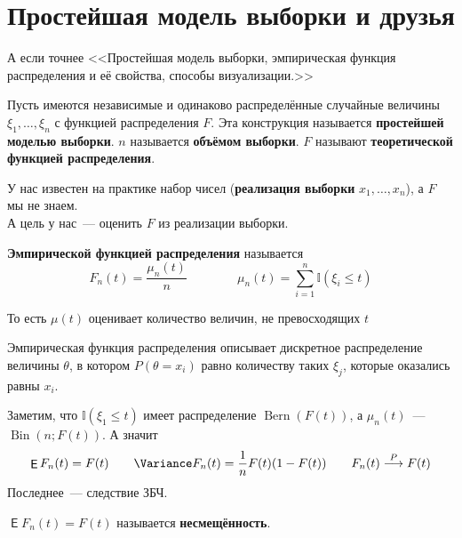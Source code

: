 \documentclass{article}
\DeclareMathOperator{\Expected}{\mathsf{E}}
\begin{document}
    \section{Простейшая модель выборки и друзья}
    \begin{remark}
        А если точнее <<Простейшая модель выборки, эмпирическая функция распределения и её свойства, способы визуализации.>>
    \end{remark}
    \begin{definition}
        Пусть имеются независимые и одинаково распределённые случайные величины $\xi_1,\ldots,\xi_n$ с функцией распределения $F$. Эта конструкция называется \textbf{простейшей моделью выборки}. $n$ называется \textbf{объёмом выборки}. $F$ называют \textbf{теоретической функцией распределения}.
    \end{definition}
    \begin{remark}
        У нас известен на практике набор чисел (\textbf{реализация выборки} $x_1,\ldots,x_n$), а $F$ мы не знаем.\\
        А цель у нас~--- оценить $F$ из реализации выборки.
    \end{remark}
    \begin{definition}
        \textbf{Эмпирической функцией распределения} называется
        \[
        F_n(t)=\frac{\mu_n(t)}n\qquad\qquad \mu_n(t)=\sum\limits_{i=1}^n\mathbb I(\xi_i\leqslant t)
        \]
    \end{definition}
    \begin{remark}
        То есть $\mu(t)$ оценивает количество величин, не превосходящих $t$
    \end{remark}
    \begin{remark}
        Эмпирическая функция распределения описывает дискретное распределение величины $\theta$, в котором $P(\theta=x_i)$ равно количеству таких $\xi_j$, которые оказались равны $x_i$.
    \end{remark}
    \begin{property}
        Заметим, что $\mathbb I(\xi_1\leqslant t)$ имеет распределение $\operatorname{Bern}(F(t))$, а $\mu_n(t)$~--- $\operatorname{Bin}(n;F(t))$. А значит
        \[
        \Expected F_n(t)=F(t)\qquad\Variance F_n(t)=\frac1nF(t)(1-F(t))\qquad F_n(t)\overset P\longrightarrow F(t)
        \]
        Последнее~--- следствие ЗБЧ.
    \end{property}
    \begin{remark}
        $\Expected F_n(t)=F(t)$ называется \textbf{несмещённость}.
    \end{remark}
\end{document}
